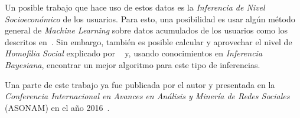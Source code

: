 \documentclass{article}
\begin{document}
Un posible trabajo que hace uso de estos datos es la \emph{Inferencia de Nivel Socioeconómico} de los usuarios. Para esto, una posibilidad es usar algún método general de \emph{Machine Learning} sobre datos acumulados de los usuarios como los descritos en~\cite{oskardottir2016}. Sin embargo, también es posible calcular y aprovechar el nivel de \emph{Homofilia Social} explicado por \citeauthor{mcpherson2001birds}~\cite{mcpherson2001birds} y, usando conocimientos en \emph{Inferencia Bayesiana}, encontrar un mejor algoritmo para este tipo de inferencias.

Una parte de este trabajo ya fue publicada por el autor y presentada en la \emph{Conferencia Internacional en Avances en Análisis y Minería de Redes Sociales} (ASONAM) en el año 2016~\cite{fixmanasonam2016}.

{}
\end{document}
